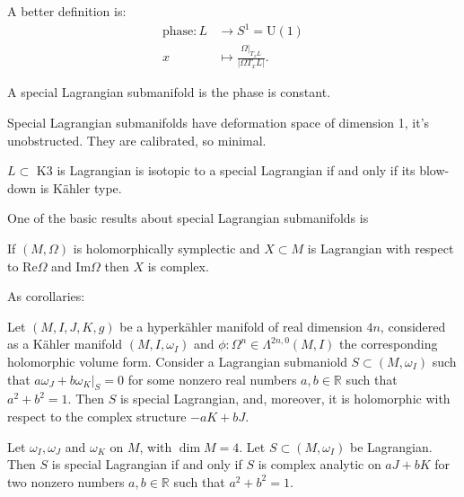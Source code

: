 \noindent
A better definition is:
$$
\begin{aligned}
\text{phase}: L &\longrightarrow
S^1=\text{U}(1) \\
x &\longmapsto \frac{\Omega|_{T_xL}}{|\Omega
T_xL|}.
\end{aligned}
$$

\begin{definition}
\label{definition-special-lagrangian}
A special Lagrangian submanifold is the phase
is constant.
\end{definition}

\noindent
Special Lagrangian submanifolds have
deformation space of
dimension 1, it's unobstructed. They are
calibrated, so minimal.

\begin{theorem}
\label{theorem-lagrangians-of-k3}
$L \subset$ K3 is Lagrangian is isotopic to a
special Lagrangian
if and only if its blow-down is Kähler type.
\end{theorem}

\medskip\noindent
One of the basic results about special
Lagrangian
submanifolds is

\begin{lemma}[Hitchin]
\label{lemma-hitchin}
If $(M,\Omega)$ is holomorphically symplectic
and $X \subset M$
is Lagrangian with respect to
$\text{Re}\Omega$ and $\text{Im}\Omega$
then $X$ is complex.
\end{lemma}

\noindent
As corollaries:

\begin{corollary}
\label{lemma-corollary-hitchin}
Let $(M,I,J,K,g)$ be a hyperkähler manifold
of real dimension $4n$,
considered as a Kähler manifold
$(M,I,\omega_I)$ and $\phi:\Omega^n \in
\Lambda^{2n,0}(M,I)$ the corresponding
holomorphic volume form.
Consider a Lagrangian submaniold $S \subset
(M,\omega_I)$
such that $a \omega_J + b\omega_K|_S=0$ for
some nonzero real numbers
$a,b \in \mathbb{R}$ such that $a^2+b^2=1$.
Then $S$ is special Lagrangian, and,
moreover,
it is holomorphic with respect to the complex
structure
$-a K+b J$.
\end{corollary}

\begin{corollary}
\label{lemma-corollary2-hitchin}
Let $\omega_I,\omega_J$ and $\omega_K$ on
$M$, with $\dim M=4$.
Let $S \subset (M,\omega_I)$ be Lagrangian.
Then $S$ is special Lagrangian if and only if
$S$ is complex analytic
on $a J + b K$ for two nonzero numbers  $a,b
\in \mathbb{R}$ such that
$a^2+b^2=1$.
\end{corollary}

